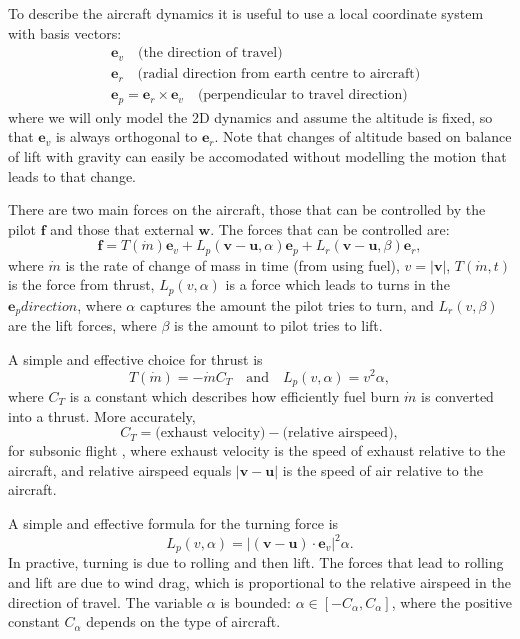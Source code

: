 \documentclass{article}
\renewcommand{\vec}[1]{\boldsymbol{#1}}
\begin{document}
To describe the aircraft dynamics it is useful to use a local coordinate system with basis vectors:
\begin{align}
    & \vec e_v \quad \text{(the direction of travel)}
    \\
    & \vec e_r \quad \text{(radial direction from earth centre to aircraft)}
    \\
    & \vec e_p = \vec e_r \times \vec e_v  \quad \text{(perpendicular to travel direction)}
\end{align}
where we will only model the 2D dynamics and assume the altitude is fixed, so that $\vec e_v$ is always orthogonal to $\vec e_r$. Note that changes of altitude based on balance of lift with gravity can easily be accomodated without modelling the motion that leads to that change. 

There are two main forces on the aircraft, those that can be controlled by the pilot $\vec f$ and those that external $\vec w$. The forces that can be controlled are: 
\begin{equation}
    \vec{f} =  T(\dot{m}) \vec{e}_v + {L_p}(\vec v - \vec u, \alpha) \vec{e}_p  + {L_r}(\vec v - \vec u,\beta) \vec{e}_r,
\end{equation}
where $\dot m$ is the rate of change of mass in time (from using fuel), $v = |\vec v|$, $T(\dot{m},t)$ is the force from thrust, ${L_p}(v, \alpha)$ is a force which leads to turns in the $\vec e_p direction$, where $\alpha$ captures the amount the pilot tries to turn, and $L_r(v,\beta)$ are the lift forces, where $\beta$ is the amount to pilot tries to lift. 

A simple and effective choice for thrust is
\begin{equation}
    T(\dot{m}) = - \dot m C_{T} \quad \text{and} \quad 
    L_p (v, \alpha) = v^2 \alpha,
\end{equation}
where $C_T$ is a constant which describes how efficiently fuel burn $\dot m$ is converted into a thrust. More accurately, 
\[
C_T = \text{(exhaust velocity)} - \text{(relative airspeed)},
\] 
for subsonic flight \cite[Chapter 4]{anderson2005introduction}, where exhaust velocity is the speed of exhaust relative to the aircraft, and relative airspeed equals $|\vec v - \vec u|$ is the speed of air relative to the aircraft.

A simple and effective formula for the turning force is
\begin{equation}
    L_p (v, \alpha) = |(\vec v - \vec u) \cdot \vec e_v|^2 \alpha.
\end{equation}
In practive, turning is due to rolling and then lift. The forces that lead to rolling and lift are due to wind drag, which is proportional to the relative airspeed in the direction of travel. The variable $\alpha$ is bounded: $\alpha \in [-C_\alpha, C_\alpha]$, where the positive constant $C_\alpha$ depends on the type of aircraft.
\end{document}
